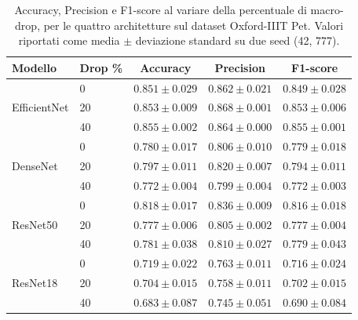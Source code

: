 \begin{table}[!ht]
    \centering
    \small
    \caption{Accuracy, Precision e F1-score al variare della percentuale di macro-drop, 
    per le quattro architetture sul dataset Oxford-IIIT Pet. Valori riportati come media $\pm$ deviazione standard su due seed (42, 777).}
    \label{tab:metriche-pet-macro}
    \begin{tabular}{llccc}
        \toprule
        \textbf{Modello} & \textbf{Drop \%} & \textbf{Accuracy} & \textbf{Precision} & \textbf{F1-score} \\
        \midrule
        \multirow{3}{*}{EfficientNet} & 0  & $0.851 \pm 0.029$ & $0.862 \pm 0.021$ & $0.849 \pm 0.028$ \\
                                       & 20 & $0.853 \pm 0.009$ & $0.868 \pm 0.001$ & $0.853 \pm 0.006$ \\
                                       & 40 & $0.855 \pm 0.002$ & $0.864 \pm 0.000$ & $0.855 \pm 0.001$ \\
        \midrule
        \multirow{3}{*}{DenseNet}     & 0  & $0.780 \pm 0.017$ & $0.806 \pm 0.010$ & $0.779 \pm 0.018$ \\
                                       & 20 & $0.797 \pm 0.011$ & $0.820 \pm 0.007$ & $0.794 \pm 0.011$ \\
                                       & 40 & $0.772 \pm 0.004$ & $0.799 \pm 0.004$ & $0.772 \pm 0.003$ \\
        \midrule
        \multirow{3}{*}{ResNet50}     & 0  & $0.818 \pm 0.017$ & $0.836 \pm 0.009$ & $0.816 \pm 0.018$ \\
                                       & 20 & $0.777 \pm 0.006$ & $0.805 \pm 0.002$ & $0.777 \pm 0.004$ \\
                                       & 40 & $0.781 \pm 0.038$ & $0.810 \pm 0.027$ & $0.779 \pm 0.043$ \\
        \midrule
        \multirow{3}{*}{ResNet18}     & 0  & $0.719 \pm 0.022$ & $0.763 \pm 0.011$ & $0.716 \pm 0.024$ \\
                                       & 20 & $0.704 \pm 0.015$ & $0.758 \pm 0.011$ & $0.702 \pm 0.015$ \\
                                       & 40 & $0.683 \pm 0.087$ & $0.745 \pm 0.051$ & $0.690 \pm 0.084$ \\
        \bottomrule
    \end{tabular}
\end{table}

\FloatBarrier

